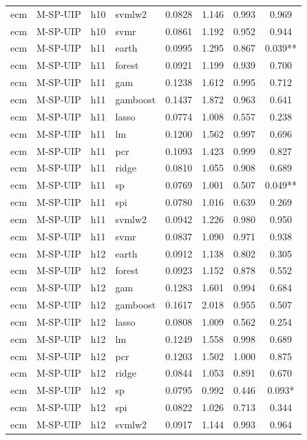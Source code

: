 \begin{ThreePartTable}
\begin{longtable}[t]{llclcccc}
ecm & M-SP-UIP & h10 & svmlw2 & 0.0828 & 1.146 & 0.993 & 0.969\\
ecm & M-SP-UIP & h10 & svmr & 0.0861 & 1.192 & 0.952 & 0.944\\
\addlinespace
ecm & M-SP-UIP & h11 & earth & 0.0995 & 1.295 & 0.867 & 0.039**\\
ecm & M-SP-UIP & h11 & forest & 0.0921 & 1.199 & 0.939 & 0.700\\
ecm & M-SP-UIP & h11 & gam & 0.1238 & 1.612 & 0.995 & 0.712\\
ecm & M-SP-UIP & h11 & gamboost & 0.1437 & 1.872 & 0.963 & 0.641\\
ecm & M-SP-UIP & h11 & lasso & 0.0774 & 1.008 & 0.557 & 0.238\\
ecm & M-SP-UIP & h11 & lm & 0.1200 & 1.562 & 0.997 & 0.696\\
ecm & M-SP-UIP & h11 & pcr & 0.1093 & 1.423 & 0.999 & 0.827\\
ecm & M-SP-UIP & h11 & ridge & 0.0810 & 1.055 & 0.908 & 0.689\\
ecm & M-SP-UIP & h11 & sp & 0.0769 & 1.001 & 0.507 & 0.049**\\
ecm & M-SP-UIP & h11 & spi & 0.0780 & 1.016 & 0.639 & 0.269\\
ecm & M-SP-UIP & h11 & svmlw2 & 0.0942 & 1.226 & 0.980 & 0.950\\
ecm & M-SP-UIP & h11 & svmr & 0.0837 & 1.090 & 0.971 & 0.938\\
\addlinespace
ecm & M-SP-UIP & h12 & earth & 0.0912 & 1.138 & 0.802 & 0.305\\
ecm & M-SP-UIP & h12 & forest & 0.0923 & 1.152 & 0.878 & 0.552\\
ecm & M-SP-UIP & h12 & gam & 0.1283 & 1.601 & 0.994 & 0.684\\
ecm & M-SP-UIP & h12 & gamboost & 0.1617 & 2.018 & 0.955 & 0.507\\
ecm & M-SP-UIP & h12 & lasso & 0.0808 & 1.009 & 0.562 & 0.254\\
ecm & M-SP-UIP & h12 & lm & 0.1249 & 1.558 & 0.998 & 0.689\\
ecm & M-SP-UIP & h12 & pcr & 0.1203 & 1.502 & 1.000 & 0.875\\
ecm & M-SP-UIP & h12 & ridge & 0.0844 & 1.053 & 0.891 & 0.670\\
ecm & M-SP-UIP & h12 & sp & 0.0795 & 0.992 & 0.446 & 0.093*\\
ecm & M-SP-UIP & h12 & spi & 0.0822 & 1.026 & 0.713 & 0.344\\
ecm & M-SP-UIP & h12 & svmlw2 & 0.0917 & 1.144 & 0.993 & 0.964\\

\end{longtable}
\end{ThreePartTable}
